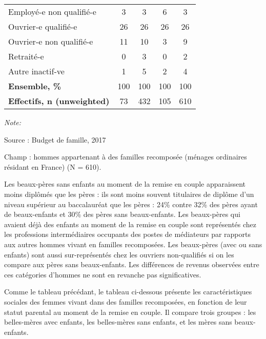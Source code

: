 \documentclass[
  12pt,
]{book}
\begin{document}
\begin{table}[!h]
{\begin{threeparttable}
\begin{tabular}[t]{lcccc}
\addlinespace
\hspace{1em}Employé-e non qualifié-e & 3 & 3 & 6 & 3\\
\hspace{1em}Ouvrier-e qualifié-e & 26 & 26 & 26 & 26\\
\hspace{1em}Ouvrier-e non qualifié-e & 11 & 10 & 3 & 9\\
\hspace{1em}Retraité-e & 0 & 3 & 0 & 2\\
\hspace{1em}Autre inactif-ve & 1 & 5 & 2 & 4\\
\addlinespace
\textbf{Ensemble, \%} & 100 & 100 & 100 & 100\\
\textbf{Effectifs, n (unweighted)} & 73 & 432 & 105 & 610\\
\bottomrule
\end{tabular}
\begin{tablenotes}
\item \textit{Note: } 
\item Source : Budget de famille, 2017
\item Champ : hommes appartenant à des familles recomposée (ménages ordinaires résidant en France) (N = 610).
\end{tablenotes}
\end{threeparttable}}
\end{table}

Les beaux-pères sans enfants au moment de la remise en couple
apparaissent moins diplômés que les pères : ils sont moins souvent
titulaires de diplôme d'un niveau supérieur au baccalauréat que les
pères : 24\% contre 32\% des pères ayant de beaux-enfants et 30\% des
pères sans beaux-enfants. Les beaux-pères qui avaient déjà des enfants
au moment de la remise en couple sont représentés chez les professions
intermédiaires occupants des postes de médiateurs par rapports aux
autres hommes vivant en familles recomposées. Les beaux-pères (avec ou
sans enfants) sont aussi sur-représentés chez les ouvriers non-qualifiés
si on les compare aux pères sans beaux-enfants. Les différences de
revenus observées entre ces catégories d'hommes ne sont en revanche pas
significatives.

Comme le tableau précédant, le tableau ci-dessous présente les
caractéristiques sociales des femmes vivant dans des familles
recomposées, en fonction de leur statut parental au moment de la remise
en couple. Il compare trois groupes : les belles-mères avec enfants, les
belles-mères sans enfants, et les mères sans beaux-enfants.
\end{document}
